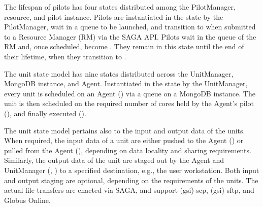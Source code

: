 The lifespan of pilots has four states distributed among the PilotManager,
resource, and pilot instance.%
Pilots are instantiated in the state  by the PilotManager, wait in a queue to be
launched, and transition to  when submitted to a Resource Manager
(RM) via the SAGA API\@. Pilots wait in the queue of the RM and, once scheduled,
become . They remain in this state until the end of their
lifetime, when they transition to .

%
The unit state model has nine states distributed across the UnitManager,
MongoDB instance, and Agent.%
Instantiated in the state  by the UnitManager, every unit is scheduled on an Agent
() via a queue on a MongoDB instance. The unit is then
scheduled on the required number of cores held by the Agent's pilot
(), and finally executed ().

The unit state model pertains also to the input and output data of the units.
When required, the input data of a unit are either pushed to the Agent
() or pulled from the Agent (), depending
on data locality and sharing requirements. Similarly, the output data of the
unit are staged out by the Agent and UnitManager (,
) to a specified destination, e.g., the user workstation.
Both input and output staging are optional, depending on the requirements of
the units. The actual file transfers are enacted via SAGA, and support
(gsi)-scp, (gsi)-sftp, and Globus Online.


